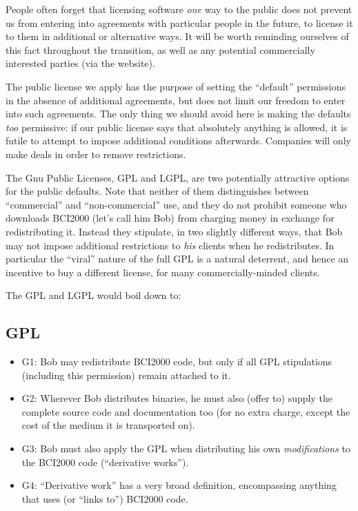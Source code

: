 \documentclass{article}
\begin{document}
People often forget that licensing software {\em one} way to the public does not prevent us from entering into agreements with particular people in the future, to license it to them in additional or alternative ways.  It will be worth reminding ourselves of this fact throughout the transition, as well as any potential commercially interested parties (via the website). 

The public license we apply has the purpose of setting the ``default'' permissions in the absence of additional agreements,  but does not limit our freedom to enter into such agreements.  The only thing we should avoid here is making the defaults {\em too} permissive: if our public license says that absolutely anything is allowed, it is futile to attempt to impose additional conditions afterwards. Companies will only make deals in order to remove restrictions.

The Gnu Public Licenses, GPL and LGPL, are two potentially attractive options for the public defaults.  Note that neither of them distinguishes between ``commercial'' and ``non-commercial'' use, and they do not prohibit someone who downloads BCI2000 (let's call him Bob) from charging money in exchange for redistributing it. Instead they stipulate, in two slightly different ways, that Bob may not impose additional restrictions to {\em his} clients when he redistributes. In particular the ``viral'' nature of the full GPL is a natural deterrent, and hence an incentive to buy a different license, for many commercially-minded clients.

The GPL and LGPL would boil down to:

\subsection*{GPL}
\begin{itemize}
   \item[] G1:  Bob may redistribute BCI2000 code, but only if all GPL stipulations (including this permission) remain attached to it.
   \item[] G2:  Wherever Bob distributes binaries, he must also (offer to) supply the complete source code and documentation too (for no extra charge, except the cost of the medium it is transported on).
   \item[] G3:  Bob must also apply the GPL when distributing his own {\em modifications} to the BCI2000 code (``derivative works'').
   \item[] G4:  ``Derivative work'' has a very broad definition, encompassing anything that uses (or ``links to'') BCI2000 code.
\end{itemize}
\end{document}
